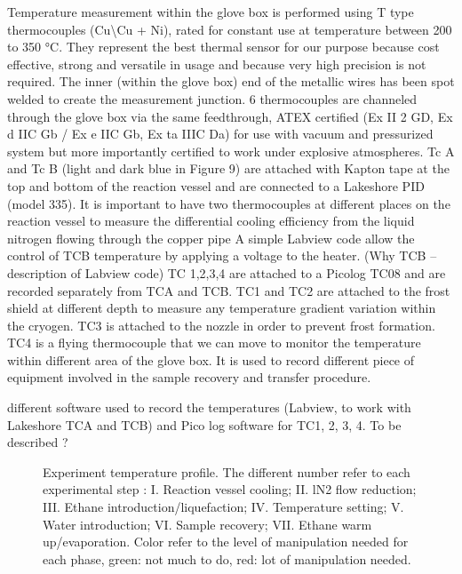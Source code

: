 \documentclass[letterpaper,10pt,english]{jupyterBook}
\begin{document}
\sphinxAtStartPar
Temperature measurement within the glove box is performed using T type thermocouples (Cu\textbackslash{}Cu + Ni), rated for constant use at temperature between \sphinxhyphen{}200 to 350 °C.
They represent the best thermal sensor for our purpose because cost effective, strong and versatile in usage and because very high precision is not required.
The inner (within the glove box) end of the metallic wires has been spot welded to create the measurement junction. 6 thermocouples are channeled through the glove box via the same feedthrough, ATEX certified (Ex II 2 GD, Ex d IIC Gb / Ex e IIC Gb, Ex ta IIIC Da) for use with vacuum and pressurized system but more importantly certified to work under explosive atmospheres.
Tc A and Tc B (light and dark blue in Figure 9) are attached with Kapton tape at the top and bottom of the reaction vessel and are connected to a Lakeshore PID (model 335). It is important to have two thermocouples at different places on the reaction vessel to measure the differential cooling efficiency from the liquid nitrogen flowing through the copper pipe
A simple Labview code allow the control of TCB temperature by applying a voltage to the heater.  (Why TCB – description of Labview code)
TC 1,2,3,4 are attached to a Picolog TC\sphinxhyphen{}08 and are recorded separately from TCA and TCB.
TC1 and TC2 are attached to the frost shield at different depth to measure any temperature gradient variation within the cryogen.
TC3 is attached to the nozzle in order to prevent frost formation.
TC4 is a flying thermocouple that we can move to monitor the temperature within different area of the glove box. It is used to record different piece of equipment involved in the sample recovery and transfer procedure.

 different software used to record the temperatures (Labview, to work with Lakeshore TCA and TCB) and Pico log software for TC1, 2, 3, 4. To be described ?

\begin{figure}[htbp]
\centering
\capstart

\noindent{}
\caption{Experiment temperature profile. The different number refer to each experimental step : I. Reaction vessel cooling; II. lN2 flow reduction; III. Ethane introduction/liquefaction; IV. Temperature setting; V. Water introduction; VI. Sample recovery; VII. Ethane warm up/evaporation. Color refer to the level of manipulation needed for each phase, green: not much to do, red: lot of manipulation needed.}\label{\detokenize{Chapter7/Chapter7:id4}}\end{figure}
\end{document}
